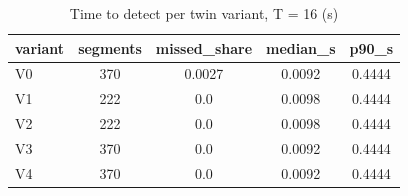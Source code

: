 \begin{table}[htbp]
\centering
\caption{Time to detect per twin variant, T = 16 (s)}
\label{tab:twin_time_to_detect}
\begin{tabular}{lcccc}
\toprule
variant & segments & missed\_share & median\_s & p90\_s \\
\midrule
V0 & 370 & 0.0027 & 0.0092 & 0.4444 \\
V1 & 222 & 0.0 & 0.0098 & 0.4444 \\
V2 & 222 & 0.0 & 0.0098 & 0.4444 \\
V3 & 370 & 0.0 & 0.0092 & 0.4444 \\
V4 & 370 & 0.0 & 0.0092 & 0.4444 \\
\bottomrule
\end{tabular}
\end{table}